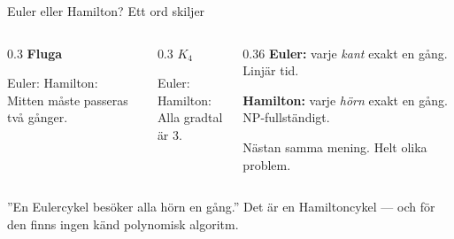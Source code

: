 \begin{frame}{Euler eller Hamilton? Ett ord skiljer}
\begin{columns}[T]
\begin{column}{0.3\textwidth}
\centering
{\small\bfseries\color{kthnavy}Fluga}\par\smallskip
{}\par\smallskip
\footnotesize Euler: \ja\quad Hamilton: \nej\\ Mitten måste passeras två gånger.
\end{column}
\begin{column}{0.3\textwidth}
\centering
{\small\bfseries\color{kthnavy}$K_4$}\par\smallskip
{}\par\smallskip
\footnotesize Euler: \nej\quad Hamilton: \ja\\ Alla gradtal är 3.
\end{column}
\begin{column}{0.36\textwidth}
\small
\textbf{Euler:} varje \emph{kant} exakt en gång. Linjär tid.\par\smallskip
\textbf{Hamilton:} varje \emph{hörn} exakt en gång. NP-fullständigt.\par\medskip
Nästan samma mening. Helt olika problem.
\end{column}
\end{columns}
\vfill
\begin{missbox}
”En Eulercykel besöker alla hörn en gång.” Det är en Hamiltoncykel — och för den finns
ingen känd polynomisk algoritm.
\end{missbox}
\end{frame}

